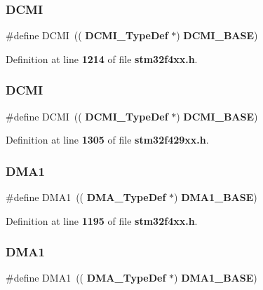 \subsubsection{D\+C\+MI\hspace{0.1cm}{\footnotesize\ttfamily [1/2]}}
{\footnotesize\ttfamily \#define D\+C\+MI~((\textbf{ D\+C\+M\+I\+\_\+\+Type\+Def} $\ast$) \textbf{ D\+C\+M\+I\+\_\+\+B\+A\+SE})}



Definition at line \textbf{ 1214} of file \textbf{ stm32f4xx.\+h}.

\mbox{\label{group__Peripheral__declaration_ga049d9f61cb078d642e68f3c22bb6d90c}} 
\subsubsection{D\+C\+MI\hspace{0.1cm}{\footnotesize\ttfamily [2/2]}}
{\footnotesize\ttfamily \#define D\+C\+MI~((\textbf{ D\+C\+M\+I\+\_\+\+Type\+Def} $\ast$) \textbf{ D\+C\+M\+I\+\_\+\+B\+A\+SE})}



Definition at line \textbf{ 1305} of file \textbf{ stm32f429xx.\+h}.

\mbox{\label{group__Peripheral__declaration_gacc16d2a5937f7585320a98f7f6b578f9}} 
\subsubsection{D\+M\+A1\hspace{0.1cm}{\footnotesize\ttfamily [1/2]}}
{\footnotesize\ttfamily \#define D\+M\+A1~((\textbf{ D\+M\+A\+\_\+\+Type\+Def} $\ast$) \textbf{ D\+M\+A1\+\_\+\+B\+A\+SE})}



Definition at line \textbf{ 1195} of file \textbf{ stm32f4xx.\+h}.

\mbox{\label{group__Peripheral__declaration_gacc16d2a5937f7585320a98f7f6b578f9}} 
\subsubsection{D\+M\+A1\hspace{0.1cm}{\footnotesize\ttfamily [2/2]}}
{\footnotesize\ttfamily \#define D\+M\+A1~((\textbf{ D\+M\+A\+\_\+\+Type\+Def} $\ast$) \textbf{ D\+M\+A1\+\_\+\+B\+A\+SE})}



